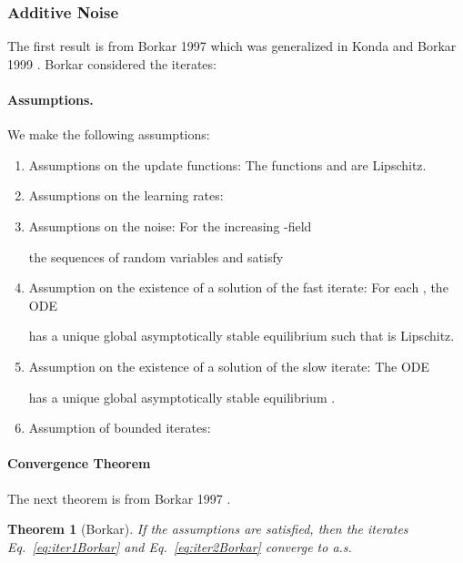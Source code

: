\documentclass{article}
\newtheorem{theorem}{Theorem}
\begin{document}
\subsubsection{Additive Noise}
The first result is from Borkar 1997 \cite{Borkar:97}
which was generalized in Konda and Borkar 1999 \cite{Konda:99}.
Borkar considered the iterates:




\paragraph{Assumptions.}
We make the following assumptions:
\begin{enumerate}[label=\textbf{(A\arabic*)}]
\item Assumptions on the update functions:
The functions  and   are Lipschitz.
\item
Assumptions on the learning rates:



\item Assumptions on the noise:
For the increasing -field

the sequences of random variables
 and
 satisfy



\item Assumption on the existence of a solution of the fast iterate:
For each , the ODE

has a unique global asymptotically stable equilibrium
 such that  is Lipschitz.

\item Assumption on the existence of a solution of the slow iterate:
The ODE

has a unique global asymptotically stable
equilibrium .

\item Assumption of bounded iterates:

\end{enumerate}

\paragraph{Convergence Theorem}

The next theorem is from Borkar 1997 \cite{Borkar:97}.
\begin{theorem}[Borkar]
\label{th:borkar}
If the assumptions are satisfied,
then the iterates Eq.~\eqref{eq:iter1Borkar} and Eq.~\eqref{eq:iter2Borkar}
converge to  a.s.
\end{theorem}
\end{document}
